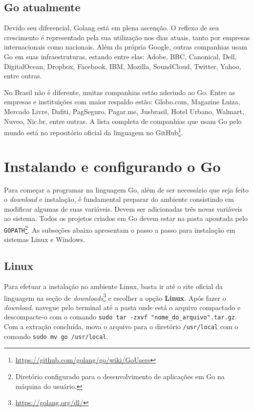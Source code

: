 \documentclass{SBCbookchapter}
\begin{document}
\subsection{Go atualmente}

Devido seu diferencial, Golang está em plena ascenção. O reflexo de seu crescimento é representado pela sua utilização nos dias atuais, tanto por empresas internacionais como nacionais. Além da própria Google, outras companhias usam Go em suas infraestruturas, estando entre elas: Adobe, BBC, Canonical, Dell, DigitalOcean, Dropbox, Facebook, IBM, Mozilla, SoundCloud, Twitter, Yahoo, entre outras.

No Brasil não é diferente, muitas companhias estão aderindo ao Go. Entre as empresas e instituições com maior respaldo estão: Globo.com, Magazine Luiza, Mercado Livre, Dafiti, PagSeguro, Pagar.me, Jusbrasil, Hotel Urbano, Walmart, Nuveo, Nic.br, entre outras. A lista completa de companhias que usam Go pelo mundo está no repositório oficial da linguagem no GitHub\footnote{\url{https://github.com/golang/go/wiki/GoUsers}}.

\section{Instalando e configurando o Go}

Para começar a programar na linguagem Go, além de ser necessário que seja feito o \textit{download} e instalação, é fundamental preparar do ambiente consistindo em modificar algumas de suas variáveis. Devem ser adicionadas três novas variáveis ao sistema. Todos os projetos criados em Go devem estar na pasta apontada pelo \texttt{GOPATH}\footnote{Diretório configurado para o desenvolvimento de aplicações em Go na máquina do usuário.}. As subseções abaixo apresentam o passo a passo para instalação em sistemas Linux e Windows.

\subsection{Linux}

Para efetuar a instalação no ambiente Linux, basta ir até o site oficial da linguagem na seção de \textit{downloads}\footnote{\label{note1}\url{https://golang.org/dl/}} e escolher a opção \textbf{Linux}. Após fazer o \textit{download}, navegue pelo terminal até a pasta onde está o arquivo compactado e descompacte-o com o comando \texttt{sudo tar -zxvf "nome\_do\_arquivo".tar.gz}. Com a extração concluída, mova o arquivo para o diretório \texttt{/usr/local} com o comando \texttt{sudo mv go /usr/local}.
\end{document}
